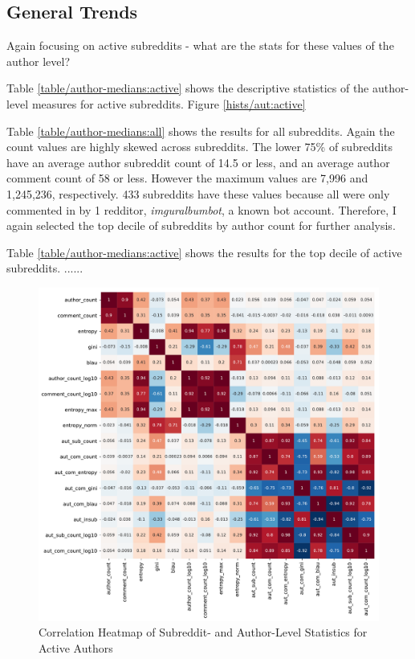 

 \label{hists/aut:active}

\subsection{General Trends}
Again focusing on active subreddits - what are the stats for these values of the author level?

Table \ref{table/author-medians:active} shows the descriptive statistics of the author-level measures for active subreddits. Figure \ref{hists/aut:active}


Table \ref{table/author-medians:all} shows the results for all subreddits. Again the count values are highly skewed across subreddits. The lower 75\% of subreddits have an average author subreddit count of 14.5 or less, and an average author comment count of 58 or less. However the maximum values are 7,996 and 1,245,236, respectively. 433 subreddits have these values because all were only commented in by 1 redditor, \textit{imguralbumbot}, a known bot account. Therefore, I again selected the top decile of subreddits by author count for further analysis.

Table \ref{table/author-medians:active} shows the results for the top decile of active subreddits. 
......

\begin{figure}
    \includegraphics[scale=0.55]{latex/matrix/corr-heat-active.pdf}
    \caption{Correlation Heatmap of Subreddit- and Author-Level Statistics for Active Authors}
    \label{corr-heat}
\end{figure}

